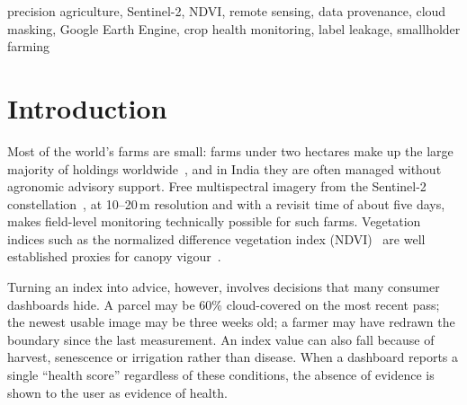 \documentclass[conference]{IEEEtran}
\begin{document}
\begin{IEEEkeywords}
precision agriculture, Sentinel-2, NDVI, remote sensing, data provenance, cloud masking, Google Earth Engine, crop health monitoring, label leakage, smallholder farming
\end{IEEEkeywords}

\section{Introduction}
Most of the world's farms are small: farms under two hectares make up the large majority of holdings worldwide~\cite{lowder2016}, and in India they are often managed without agronomic advisory support. Free multispectral imagery from the Sentinel-2 constellation~\cite{drusch2012}, at 10--20\,m resolution and with a revisit time of about five days, makes field-level monitoring technically possible for such farms. Vegetation indices such as the normalized difference vegetation index (NDVI)~\cite{rouse1974} are well established proxies for canopy vigour~\cite{mulla2013,weiss2020}.

Turning an index into advice, however, involves decisions that many consumer dashboards hide. A parcel may be 60\% cloud-covered on the most recent pass; the newest usable image may be three weeks old; a farmer may have redrawn the boundary since the last measurement. An index value can also fall because of harvest, senescence or irrigation rather than disease. When a dashboard reports a single ``health score'' regardless of these conditions, the absence of evidence is shown to the user as evidence of health.
\end{document}
